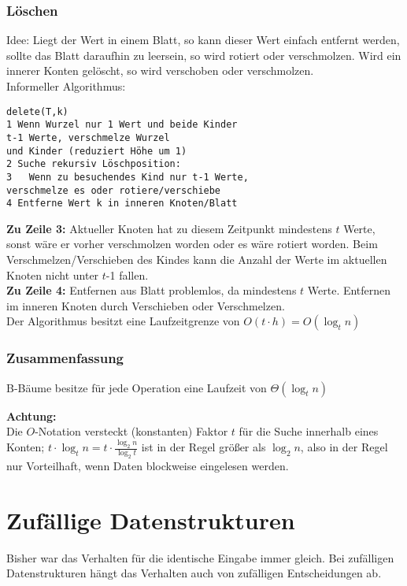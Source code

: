 \documentclass[jou,apacite]{apa6}
\begin{document}
\subsubsection{Löschen}
Idee: Liegt der Wert in einem Blatt, so kann dieser Wert einfach entfernt werden, sollte das Blatt daraufhin \dq zu leer\dq  sein, so wird rotiert oder verschmolzen. Wird ein innerer Konten gelöscht, so wird verschoben oder verschmolzen. \\
Informeller Algorithmus:
\begin{lstlisting}
delete(T,k)
1 Wenn Wurzel nur 1 Wert und beide Kinder
t-1 Werte, verschmelze Wurzel 
und Kinder (reduziert Höhe um 1)
2 Suche rekursiv Löschposition:
3   Wenn zu besuchendes Kind nur t-1 Werte,
verschmelze es oder rotiere/verschiebe
4 Entferne Wert k in inneren Knoten/Blatt
\end{lstlisting}
{\bfseries Zu Zeile 3:} Aktueller Knoten hat zu diesem Zeitpunkt mindestens $t$ Werte, sonst wäre
er vorher verschmolzen worden oder es wäre rotiert worden.
Beim Verschmelzen/Verschieben des Kindes kann die Anzahl der Werte
im aktuellen Knoten nicht unter $t$-1 fallen.\\
{\bfseries Zu Zeile 4:} Entfernen aus Blatt problemlos, da mindestens $t$ Werte.
Entfernen im inneren Knoten durch Verschieben oder Verschmelzen.\\
Der Algorithmus besitzt eine Laufzeitgrenze von $O(t \cdot h) = O(\log_t n)$

\subsubsection{Zusammenfassung}
B-Bäume besitze für jede Operation eine Laufzeit von $\Theta(\log_t n)$ 

{\bfseries Achtung:} \\
Die $O$-Notation versteckt (konstanten) Faktor $t$ für die Suche innerhalb eines Konten;
$t \cdot \log_t n = t \cdot \frac{\log_{2}n}{\log_{2}t} $ ist in der Regel größer als $\log_{2}n$, also in der Regel nur Vorteilhaft, wenn Daten blockweise eingelesen werden.

\section{Zufällige Datenstrukturen}
Bisher war das Verhalten für die identische Eingabe immer gleich. Bei zufälligen Datenstrukturen hängt das Verhalten auch von zufälligen Entscheidungen ab.
\end{document}
